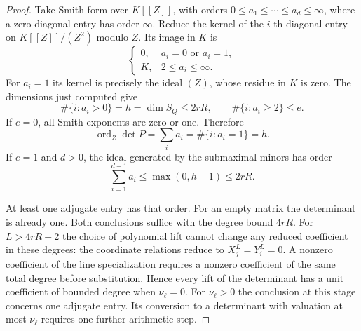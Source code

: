 \begin{proof}
Take Smith form over \(K[[Z]]\), with orders
\(0\le a_1\le\cdots\le a_d\le\infty\), where a zero
diagonal entry has order \(\infty\). Reduce the kernel of the \(i\)-th diagonal entry on \(K[[Z]]/(Z^2)\)
modulo \(Z\). Its image in \(K\) is
\[
 \begin{cases}
 0,&a_i=0\text{ or }a_i=1,\\
 K,&2\le a_i\le\infty.
 \end{cases}
\]
For \(a_i=1\) its kernel is precisely the ideal \((Z)\), whose
residue in \(K\) is zero.
The dimensions just computed give
\[
 \#\{i:a_i>0\}=h=\dim S_Q\le2rR,
 \qquad \#\{i:a_i\ge2\}\le e.
\]
If \(e=0\), all Smith exponents are zero or one. Therefore
\[
 \operatorname{ord}_Z\det P=\sum_i a_i=\#\{i:a_i=1\}=h .
\]
If \(e=1\) and \(d>0\), the ideal generated by the submaximal
minors has order
\[
 \sum_{i=1}^{d-1}a_i\le\max(0,h-1)\le2rR.
\]

At least one adjugate entry has that order. For an empty matrix
the determinant is already one. Both conclusions suffice with
the degree bound \(4rR\). For \(L>4rR+2\) the
choice of polynomial lift cannot change any reduced coefficient
in these degrees: the coordinate relations reduce to
\(X_j^L=Y_i^L=0\). A nonzero coefficient of the line
specialization requires a nonzero coefficient of the same total
degree before substitution. Hence every lift of the determinant
has a unit coefficient of bounded degree when \(\nu_\ell=0\).
For \(\nu_\ell>0\) the conclusion at this stage concerns one
adjugate entry. Its conversion to a determinant with valuation
at most \(\nu_\ell\) requires one further arithmetic step.
\end{proof}


